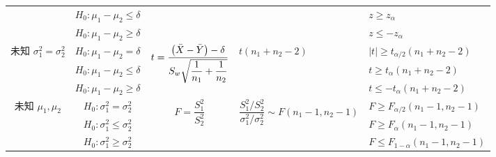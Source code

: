 \begin{table}[H]
{\begin{tabular}{cccll}
                                                          & $H_0:\mu_1-\mu_2\leqslant \delta$    &                                                                                                                   &                                                                                  & $z\geqslant z_\alpha$                    \\
                                                          & $H_0:\mu_1-\mu_2\geqslant \delta$    &                                                                                                                   &                                                                                  & $z\leqslant -z_\alpha $                  \\
            \midrule
            \multirow{3}{*}{未知 $\sigma_1^2=\sigma_2^2$} & $H_0:\mu_1-\mu_2=\delta$             & \multirow{3}{*}{$t=\dfrac{\qty(\bar{X}-\bar{Y})-\delta}{S_w\sqrt{\dfrac{1}{n_1}+\dfrac{1}{n_2}}}$}                & \multirow{3}{*}{$t(n_1+n_2-2)$}                                                  & $|t|\geqslant t_{\alpha/2}(n_1+n_2-2)$   \\
                                                          & $H_0:\mu_1-\mu_2\leqslant \delta$    &                                                                                                                   &                                                                                  & $t\geqslant t_{\alpha}(n_1+n_2-2)$       \\
                                                          & $H_0:\mu_1-\mu_2\geqslant \delta$    &                                                                                                                   &                                                                                  & $t\leqslant -t_{\alpha}(n_1+n_2-2)$      \\
            \midrule
            \multirow{3}{*}{未知 $\mu_1,\mu_2$}           & $H_0:\sigma_1^2=\sigma_2^2$          & \multirow{3}{*}{$F=\dfrac{S_1^2}{S_2^2}$}                                                                         & \multirow{3}{*}{$\dfrac{S_1^2/S_2^2}{\sigma_1^2/\sigma_2^2}\sim F(n_1-1,n_2-1)$} & $F\geqslant F_{\alpha/2}(n_1-1,n_2-1)$   \\
                                                          & $H_0:\sigma_1^2\leqslant \sigma_2^2$ &                                                                                                                   &                                                                                  & $F\geqslant F_\alpha(n_1-1,n_2-1)$       \\
                                                          & $H_0:\sigma_1^2\geqslant \sigma_2^2$ &                                                                                                                   &                                                                                  & $F\leqslant F_{1-\alpha}(n_1-1,n_2-1)$
        \end{tabular}}
\end{table}

